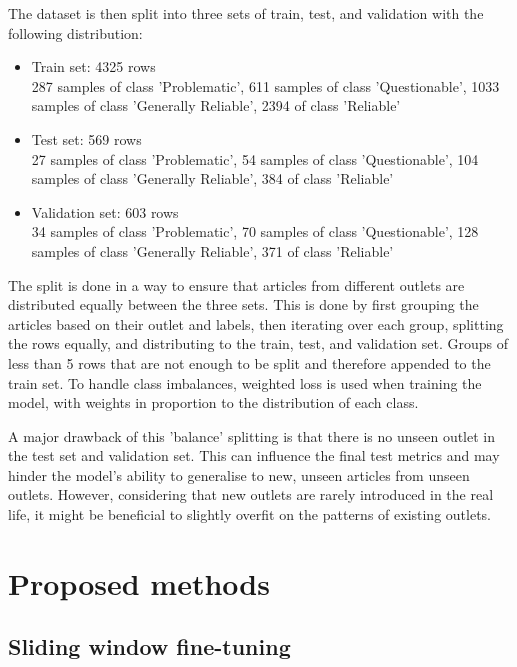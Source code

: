 The dataset is then split into three sets of train, test, and validation with the following distribution:
\begin{itemize}
    \item Train set: 4325 rows \\
          287 samples of class 'Problematic', 611 samples of class 'Questionable', 1033 samples of class 'Generally Reliable', 2394 of class 'Reliable'
    \item Test set: 569 rows \\
          27 samples of class 'Problematic', 54 samples of class 'Questionable', 104 samples of class 'Generally Reliable', 384 of class 'Reliable'
    \item Validation set: 603 rows \\
          34 samples of class 'Problematic', 70 samples of class 'Questionable', 128 samples of class 'Generally Reliable', 371 of class 'Reliable'
\end{itemize}

The split is done in a way to ensure that articles from different outlets are distributed equally between the three sets. This is done by first grouping the articles based on their outlet and labels, then iterating over each group, splitting the rows equally, and distributing to the train, test, and validation set. Groups of less than 5 rows that are not enough to be split and therefore appended to the train set. To handle class imbalances, weighted loss is used when training the model, with weights in proportion to the distribution of each class.

A major drawback of this 'balance' splitting is that there is no unseen outlet in the test set and validation set. This can influence the final test metrics and may hinder the model's ability to generalise to new, unseen articles from unseen outlets. However, considering that new outlets are rarely introduced in the real life, it might be beneficial to slightly overfit on the patterns of existing outlets.

\section{Proposed methods}

\subsection{Sliding window fine-tuning}

